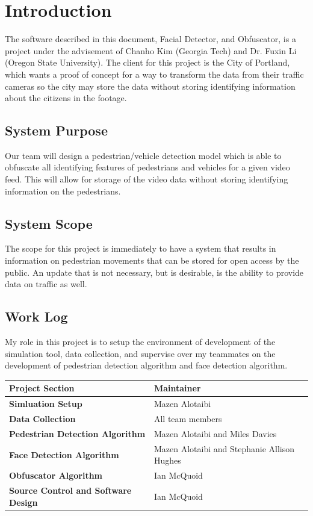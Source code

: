 \documentclass[onecolumn, draftclsnofoot,10pt, compsoc]{IEEEtran}
\def \callian{			Ian McQuoid  }
\def \callmazen{			Mazen Alotaibi }
\def \callmiles{			Miles Davies  }
\def \callsteph{			Stephanie Allison Hughes }
\begin{document}
\section{Introduction}
The software described in this document, Facial Detector, and Obfuscator, is a project under the advisement of Chanho Kim (Georgia Tech) and Dr. Fuxin Li (Oregon State University). The client for this project is the City of Portland, which wants a proof of concept for a way to transform the data from their traffic cameras so the city may store the data without storing identifying information about the citizens in the footage.

\subsection{System Purpose}
Our team will design a pedestrian/vehicle detection model which is able to obfuscate all identifying features of pedestrians and vehicles for a given video feed. This will allow for storage of the video data without storing identifying information on the pedestrians.

\subsection{System Scope}
The scope for this project is immediately to have a system that results in information on pedestrian movements that can be stored for open access by the public. An update that is not necessary, but is desirable, is the ability to provide data on traffic as well.

\subsection{Work Log}
My role in this project is to setup the environment of development of the simulation tool, data collection, and supervise over my teammates on the development of pedestrian detection algorithm and face detection algorithm.

\begin{center}
  \begin{tabular}{ | l | p{10cm} | } 
    \hline \textbf{Project Section} & \textbf{Maintainer} \\ \hline
    \textbf{Simluation Setup} & \callmazen{} \\ \hline
    \textbf{Data Collection} & All team members \\ \hline
    \textbf{Pedestrian Detection Algorithm} & \callmazen{} and \callmiles{} \\ \hline
    \textbf{Face Detection Algorithm} & \callmazen{} and \callsteph{} \\ \hline
    \textbf{Obfuscator Algorithm} & \callian{}\\ \hline
    \textbf{Source Control and Software Design} & \callian{}\\ \hline
  \end{tabular}
\end{center}
\end{document}

